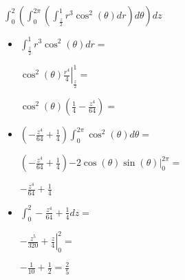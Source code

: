 \documentclass[../practica_09.tex]{subfiles}
\begin{document}
\begin{enumerate}
        $\int_0^2 (\int_0^{2\pi} (\int_{\frac{z}{2}}^1 r^3\cos^2(\theta) dr) d\theta) dz$

        \begin{itemize}
            \item $\int_{\frac{z}{2}}^1 r^3\cos^2(\theta) dr = $
            
                $\cos^2(\theta) \left. \frac{r^4}{4} \right |_{\frac{z}{2}}^1 = $

                $ \cos^2(\theta)( \frac{1}{4} - \frac{z^4}{64}  ) = $
                
            \item $( - \frac{z^4}{64} + \frac{1}{4} ) \int_0^{2\pi} \cos^2(\theta) d\theta = $
            
                $( - \frac{z^4}{64} + \frac{1}{4} )\left. - 2\cos(\theta)\sin(\theta) \right |_0^{2\pi} = $

                $ - \frac{z^4}{64} + \frac{1}{4} $
        
            \item $\int_0^2 -\frac{z^4}{64} + \frac{1}{4} dz =  $
            
                $\left. - \frac{z^5}{320} + \frac{z}{4} \right |_0^2 = $

                $ - \frac{1}{10} + \frac{1}{2} = \frac{2}{5}$

        \end{itemize}

    \end{enumerate}
\end{document}
